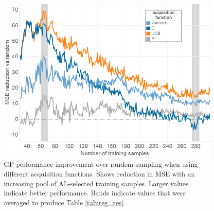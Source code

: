 \documentclass{sig-alternate}
\begin{document}

\begin{figure}[tb]
\centering
\includegraphics[width=\linewidth]{regression_experiment}
\caption{GP performance improvement over random sampling when using different acquisition functions.
Shows reduction in MSE with an increasing pool of AL-selected training samples.
Larger values indicate better performance.
Bands indicate values that were averaged to produce Table \ref{tab:reg_res}.
}
\label{fig:reg_all}
\end{figure}
\end{document}
